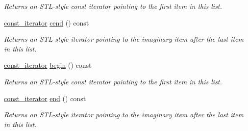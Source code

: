 \begin{DoxyCompactItemize}
\begin{DoxyCompactList}\small\item\em Returns an S\+T\+L-\/style const iterator pointing to the first item in this list. \end{DoxyCompactList}\item 
\hyperlink{class_mdt_1_1_deploy_utils_1_1_library_info_list_a07338b20f243a1c7fcb3f696a35ddd44}{const\+\_\+iterator} \hyperlink{class_mdt_1_1_deploy_utils_1_1_library_info_list_a77c1177f462f83424ce183b1c33f3e6c}{cend} () const \hypertarget{class_mdt_1_1_deploy_utils_1_1_library_info_list_a77c1177f462f83424ce183b1c33f3e6c}{}\label{class_mdt_1_1_deploy_utils_1_1_library_info_list_a77c1177f462f83424ce183b1c33f3e6c}

\begin{DoxyCompactList}\small\item\em Returns an S\+T\+L-\/style iterator pointing to the imaginary item after the last item in this list. \end{DoxyCompactList}\item 
\hyperlink{class_mdt_1_1_deploy_utils_1_1_library_info_list_a07338b20f243a1c7fcb3f696a35ddd44}{const\+\_\+iterator} \hyperlink{class_mdt_1_1_deploy_utils_1_1_library_info_list_a8615c525532a7f1dd3ae5cea7b7ff738}{begin} () const \hypertarget{class_mdt_1_1_deploy_utils_1_1_library_info_list_a8615c525532a7f1dd3ae5cea7b7ff738}{}\label{class_mdt_1_1_deploy_utils_1_1_library_info_list_a8615c525532a7f1dd3ae5cea7b7ff738}

\begin{DoxyCompactList}\small\item\em Returns an S\+T\+L-\/style const iterator pointing to the first item in this list. \end{DoxyCompactList}\item 
\hyperlink{class_mdt_1_1_deploy_utils_1_1_library_info_list_a07338b20f243a1c7fcb3f696a35ddd44}{const\+\_\+iterator} \hyperlink{class_mdt_1_1_deploy_utils_1_1_library_info_list_ac634a5731ec5fd1b0a4fef46bb5c194a}{end} () const \hypertarget{class_mdt_1_1_deploy_utils_1_1_library_info_list_ac634a5731ec5fd1b0a4fef46bb5c194a}{}\label{class_mdt_1_1_deploy_utils_1_1_library_info_list_ac634a5731ec5fd1b0a4fef46bb5c194a}

\begin{DoxyCompactList}\small\item\em Returns an S\+T\+L-\/style iterator pointing to the imaginary item after the last item in this list. \end{DoxyCompactList}\end{DoxyCompactItemize}


